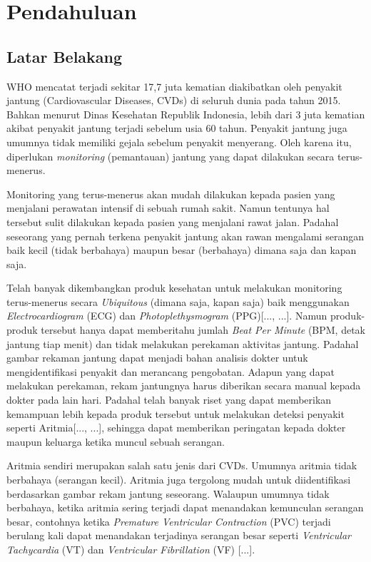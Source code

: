 \chapter{Pendahuluan}
\section{Latar Belakang}

WHO mencatat terjadi sekitar 17,7 juta kematian diakibatkan oleh penyakit jantung (Cardiovascular Diseases, CVDs) di seluruh dunia pada tahun 2015\cite{who2015facts}. Bahkan menurut Dinas Kesehatan Republik Indonesia, lebih dari 3 juta kematian akibat penyakit jantung terjadi sebelum usia 60 tahun\cite{depkes2014}. Penyakit jantung juga umumnya tidak memiliki gejala sebelum penyakit menyerang\cite{who2015facts}. Oleh karena itu, diperlukan \textit{monitoring} (pemantauan) jantung yang dapat dilakukan secara terus-menerus. 

Monitoring yang terus-menerus akan mudah dilakukan kepada pasien yang menjalani perawatan intensif di sebuah rumah sakit. Namun tentunya hal tersebut sulit dilakukan kepada pasien yang menjalani rawat jalan. Padahal seseorang yang pernah terkena penyakit jantung akan rawan mengalami serangan baik kecil (tidak berbahaya) maupun besar (berbahaya) dimana saja dan kapan saja.

Telah banyak dikembangkan produk kesehatan untuk melakukan monitoring terus-menerus secara \textit{Ubiquitous} (dimana saja, kapan saja) baik menggunakan \textit{Electrocardiogram} (ECG) dan \textit{Photoplethysmogram} (PPG)[..., ...]. Namun produk-produk tersebut hanya dapat memberitahu jumlah \textit{Beat Per Minute} (BPM, detak jantung tiap menit) dan tidak melakukan perekaman aktivitas jantung. Padahal gambar rekaman jantung dapat menjadi bahan analisis dokter untuk mengidentifikasi penyakit dan merancang pengobatan. Adapun yang dapat melakukan perekaman, rekam jantungnya harus diberikan secara manual kepada dokter pada lain hari. Padahal telah banyak riset yang dapat memberikan kemampuan lebih kepada produk tersebut untuk melakukan deteksi penyakit seperti Aritmia[..., ...], sehingga dapat memberikan peringatan kepada dokter maupun keluarga ketika muncul sebuah serangan.

Aritmia sendiri merupakan salah satu jenis dari CVDs. Umumnya aritmia tidak berbahaya (serangan kecil). Aritmia juga tergolong mudah untuk diidentifikasi berdasarkan gambar rekam jantung seseorang. Walaupun umumnya tidak berbahaya, ketika aritmia sering terjadi dapat menandakan kemunculan serangan besar, contohnya ketika \textit{Premature Ventricular Contraction} (PVC) terjadi berulang kali dapat menandakan terjadinya serangan besar seperti \textit{Ventricular Tachycardia} (VT) dan \textit{Ventricular Fibrillation} (VF) [...]. 

